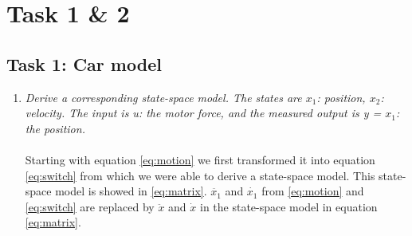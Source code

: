\documentclass[final]{scrreprt} %
\begin{document}
\chapter{Task 1 \& 2}
\label{ch:mod3-tsk1-2}

\section{Task 1: Car model}
\label{sec:mod3-tsk1}

\begin{enumerate}
\item \textit{Derive a corresponding state-space model. The states are $x_{1}$: position, $x_{2}$: velocity. The input is u: the motor force, and the measured output is y = $x_{1}$: the position.}\\
\\
Starting with equation \ref{eq:motion} we first transformed it into equation \ref{eq:switch} from which we were able to derive a state-space model. This state-space model is showed in \ref{eq:matrix}. $\ddot{x_{1}}$ and $\dot{x_{1}}$ from \ref{eq:motion} and \ref{eq:switch} are replaced by $\ddot{x}$ and $\dot{x}$ in the state-space model in equation \ref{eq:matrix}.


\end{enumerate}
\end{document}
